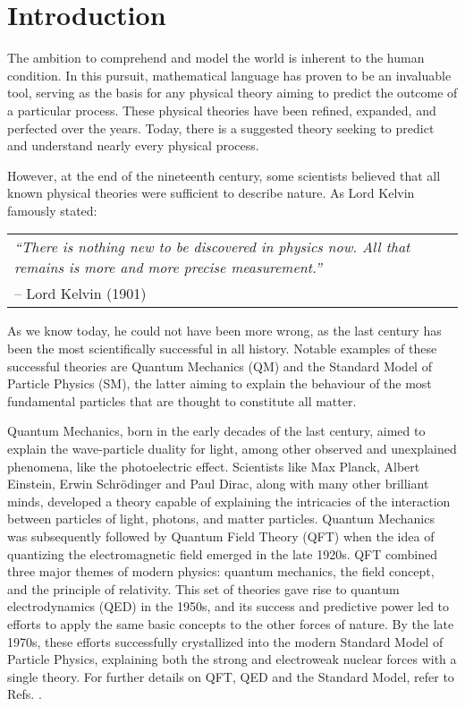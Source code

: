 \chapter*{Introduction}

The ambition to comprehend and model the world is inherent to the human condition. In this pursuit, mathematical language has proven to be an invaluable tool, serving as the basis for any physical theory aiming to predict the outcome of a particular process. These physical theories have been refined, expanded, and perfected over the years. Today, there is a suggested theory seeking to predict and understand nearly every physical process.

However, at the end of the nineteenth century, some scientists believed that all known physical theories were sufficient to describe nature. As Lord Kelvin famously stated:
\begin{center}
    \begin{tabular}{p{12cm}}
        \emph{``There is nothing new to be discovered in physics now. All that remains is more and more precise measurement.''}\\
        \hfill{}-- Lord Kelvin (1901)\\
    \end{tabular}
\end{center}
As we know today, he could not have been more wrong, as the last century has been the most scientifically successful in all history. Notable examples of these successful theories are Quantum Mechanics (QM) and the Standard Model of Particle Physics (SM), the latter aiming to explain the behaviour of the most fundamental particles that are thought to constitute all matter.

Quantum Mechanics, born in the early decades of the last century, aimed to explain the wave-particle duality for light, among other observed and unexplained phenomena, like the photoelectric effect. Scientists like Max Planck, Albert Einstein, Erwin Schrödinger and Paul Dirac, along with many other brilliant minds, developed a theory capable of explaining the intricacies of the interaction between particles of light, photons, and matter particles. Quantum Mechanics was subsequently followed by Quantum Field Theory (QFT) when the idea of quantizing the electromagnetic field emerged in the late 1920s. QFT combined three major themes of modern physics: quantum mechanics, the field concept, and the principle of relativity. This set of theories gave rise to quantum electrodynamics (QED) in the 1950s, and its success and predictive power led to efforts to apply the same basic concepts to the other forces of nature. By the late 1970s, these efforts successfully crystallized into the modern Standard Model of Particle Physics, explaining both the strong and electroweak nuclear forces with a single theory. For further details on QFT, QED and the Standard Model, refer to Refs. \cite{Perkins:1982xb, Peskin:1995ev, Schwartz:2014sze}.

